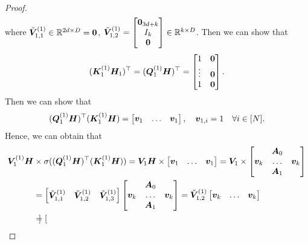 \begin{proof}
\begin{align*}
\end{align*}
where $\tilde{\boldsymbol{V}}_{1,1}^{(1)}\in\mathbb{R}^{2d\times D}=\boldsymbol{0}$, $\tilde{\boldsymbol{V}}_{1,2}^{(1)}=\begin{bmatrix}
        \boldsymbol{0}_{3d+k}\\
        I_k\\
        \boldsymbol{0}
    \end{bmatrix}\in\mathbb{R}^{k\times D}$. Then we can show that
\begin{align*}
   (\boldsymbol{K}_1^{(1)}\boldsymbol{H}_1)^\top=(\boldsymbol{Q}_1^{(1)}\boldsymbol{H})^\top = \begin{bmatrix}
        1&\boldsymbol{0}\\
        \vdots &\boldsymbol{0}\\
        1&\boldsymbol{0}
    \end{bmatrix}.
\end{align*}
Then we can show that
\begin{align*}
   (\boldsymbol{Q}_1^{(1)}\boldsymbol{H})^\top(\boldsymbol{K}_1^{(1)}\boldsymbol{H}) = \begin{bmatrix}
       \boldsymbol{v}_1&\ldots&\boldsymbol{v}_1
   \end{bmatrix},\quad \boldsymbol{v}_{1,i} = 1\quad\forall i\in[N].
\end{align*}
Hence, we can obtain that
\begin{align*}
    \boldsymbol{V}_1^{(1)}\boldsymbol{H}&\times\sigma((\boldsymbol{Q}_1^{(1)}\boldsymbol{H})^\top(\boldsymbol{K}_1^{(1)}\boldsymbol{H}))=\boldsymbol{V}_1\boldsymbol{H}\times\begin{bmatrix}
        \boldsymbol{v}_1 &\ldots&\boldsymbol{v}_1
    \end{bmatrix}=\boldsymbol{V}_1\times \begin{bmatrix}
        &\boldsymbol{A}_0&\\
        \boldsymbol{v}_k &\ldots&\boldsymbol{v}_k\\
        &\boldsymbol{A}_1&
    \end{bmatrix}\\
    &=\begin{bmatrix}
        \tilde{\boldsymbol{V}}_{1,1}^{(1)}&\tilde{\boldsymbol{V}}_{1,2}^{(1)}&\tilde{\boldsymbol{V}}_{1,3}^{(1)}
    \end{bmatrix}\begin{bmatrix}
        &\boldsymbol{A}_0&\\
        \boldsymbol{v}_k&\ldots&\boldsymbol{v}_k\\
        &\boldsymbol{A}_1&
    \end{bmatrix}=\tilde{\boldsymbol{V}}_{1,2}^{(1)}\begin{bmatrix}
        \boldsymbol{v}_k &\ldots&\boldsymbol{v}_k
    \end{bmatrix}\\
    &=\begin{bmatrix}

\end{bmatrix}
\end{align*}
\end{proof}
